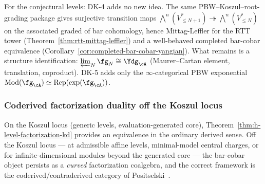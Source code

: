 \begin{remark}
For the conjectural levels: DK-4 adds no new idea.
The same PBW--Koszul--root-grading package gives surjective
transition maps $\bigwedge^n(V_{\leq N+1}^*) \twoheadrightarrow
\bigwedge^n(V_{\leq N}^*)$ on the associated graded of bar
cohomology, hence Mittag-Leffler for the RTT tower
(Theorem~\ref{thm:rtt-mittag-leffler}) and a well-behaved
completed bar-cobar equivalence
(Corollary~\ref{cor:completed-bar-cobar-yangian}).
What remains is a structure identification:
$\varprojlim_N \fg_N \cong \Ydg_\cA$
(Maurer--Cartan element, translation, coproduct).
DK-5 adds only the $\infty$-categorical PBW exponential
$\operatorname{Mod}(\fg_\cA) \simeq
\operatorname{Rep}(\exp(\fg_\cA))$.
\end{remark}

\subsubsection*{Coderived factorization duality off the Koszul locus}

On the Koszul locus (generic levels, evaluation-generated core),
Theorem~\ref{thm:h-level-factorization-kd} provides an equivalence
in the ordinary derived sense.  Off the Koszul locus --- at admissible
affine levels, minimal-model central charges, or for infinite-dimensional
modules beyond the generated core --- the bar-cobar object persists as a
\emph{curved} factorization coalgebra, and the correct framework is the
coderived/contraderived category of
Positselski~\cite{Positselski11}.

